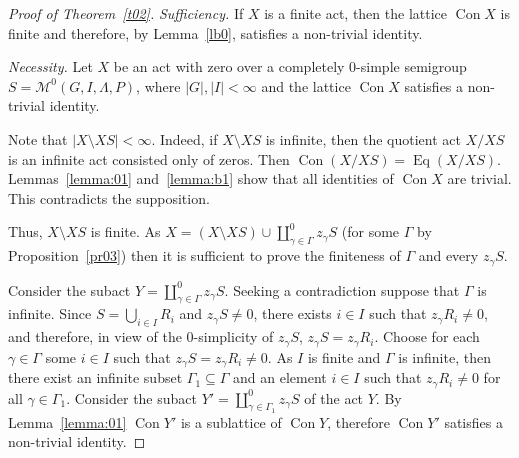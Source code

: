 \documentclass{birkau}
\numberwithin{equation}{section}
\theoremstyle{plain}
\theoremstyle{definition}
\DeclareMathOperator{\Con}{Con}
\DeclareMathOperator{\Eq}{Eq}
\begin{document}
	\begin{proof}[Proof of Theorem~\ref{t02}]
		\textit{Sufficiency.} If $X$ is a finite act, then the lattice  $\Con X$ is finite and therefore, by Lemma~\ref{lb0}, satisfies a non-trivial identity.
		
		\textit{Necessity.} Let $X$ be an act with zero over a completely 0-simple semigroup $S={\mathcal M}^0(G,I,\Lambda,P)$, where $|G|,|I| <\infty$ and the lattice $\Con X$ satisfies a non-trivial identity.

        Note that $|X\setminus XS|<\infty$. Indeed, if $X\setminus XS$ is infinite, then the quotient act $X/XS$ is an infinite act consisted only of zeros. Then $\Con (X/XS) = \Eq (X/XS)$. Lemmas~\ref{lemma:01} and~\ref{lemma:b1} show that all identities of $\Con X$ are trivial. This contradicts the supposition.

        Thus, $X\setminus XS$ is finite. As $X=(X\setminus XS)\cup \coprod_{\gamma \in \Gamma}^0 z_\gamma S$ (for some $\Gamma$ by Proposition~\ref{pr03}) then it is sufficient to prove the finiteness of $\Gamma$ and every $z_\gamma S$.

        Consider the subact $Y=\coprod_{\gamma \in \Gamma}^0 z_\gamma S$. Seeking a contradiction suppose that $\Gamma$ is infinite. Since $S=\bigcup_{i \in I}R_i$ and $z_\gamma S \ne 0$, there exists $i \in I$ such that $z_\gamma R_i \ne 0$, and therefore, in view of the 0-simplicity of $z_\gamma S$, $z_\gamma S = z_\gamma R_i$. Choose for each $\gamma \in \Gamma$ some $i \in I$ such that $z_\gamma S = z_\gamma R_i \ne 0$. As $I$ is finite and $\Gamma$ is infinite, then there exist an infinite subset $\Gamma_1 \subseteq \Gamma$ and an element $i \in I$ such that $z_\gamma R_i \ne 0$ for all $\gamma \in \Gamma_1$. Consider the subact $Y' =\coprod_{\gamma \in \Gamma_1}^0 z_\gamma S$ of the act $Y$. By Lemma~\ref{lemma:01} $\Con Y'$ is a sublattice of $\Con Y$, therefore $\Con Y'$ satisfies a non-trivial identity.


\end{proof}
\end{document}
